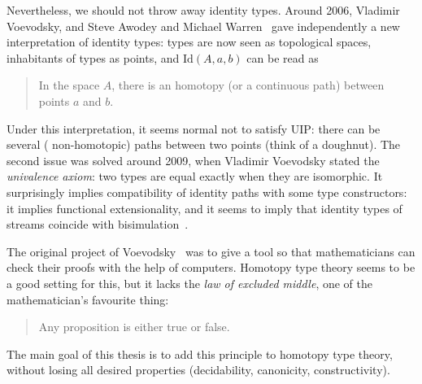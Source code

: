 Nevertheless, we should not throw away identity types. Around 2006,
Vladimir Voevodsky, and Steve Awodey and Michael
Warren~\cite{awodey-warren} gave independently a new interpretation of
identity types: types are now seen as topological spaces, inhabitants
of types as points, and $\mathrm{Id}(A,a,b)$ can be read as
\begin{quotation} In the space $A$, there is an homotopy (or a
continuous path) between points $a$ and $b$.
\end{quotation} Under this interpretation, it seems normal not to
satisfy UIP: there can be several (\ie{} non-homotopic) paths between
two points (think of a doughnut). The second issue was solved around
2009, when Vladimir Voevodsky stated the {\em univalence axiom}: two
types are equal exactly when they are isomorphic. It surprisingly
implies compatibility of identity paths with some type constructors:
it implies functional extensionality,
and it seems to imply that identity types of streams coincide with bisimulation~\cite{licata-bisim}.

The original project of Voevodsky~\cite{vv-nsf} was to give a tool so
that mathematicians can check their proofs with the help of
computers. Homotopy type theory seems to be a good setting for this,
but it lacks the {\em law of excluded middle}, one of the
mathematician's favourite thing:
\begin{quotation}
  Any proposition is either true or false.
\end{quotation}
The main goal of this thesis is to add this principle to homotopy type
theory, without losing all desired properties (decidability,
canonicity, constructivity).


